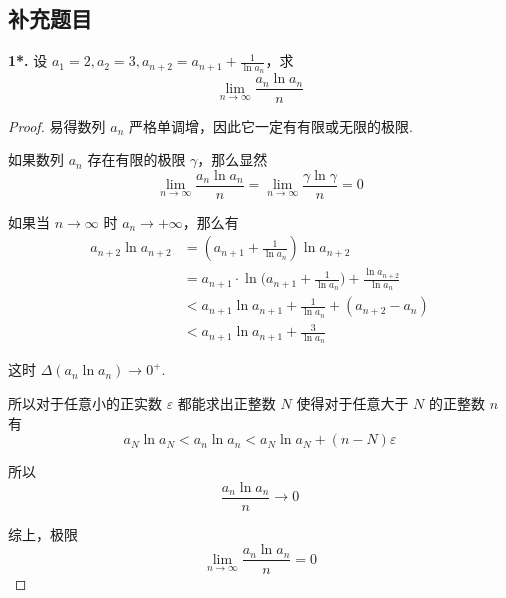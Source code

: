 \subsection{补充题目}
\textbf{1*.} 设 $\displaystyle a_1 = 2, a_2 = 3, a_{n+2} = a_{n+1} + \frac{1}{\ln a_n}$，求
\[\lim_{n \rightarrow \infty} \frac{a_n \ln a_n}{n}\]

\begin{proof}
    易得数列 $a_n$ 严格单调增，因此它一定有有限或无限的极限.

    如果数列 $a_n$ 存在有限的极限 $\gamma$，那么显然
    \[\lim_{n \rightarrow \infty} \frac{a_n \ln a_n}{n} = \lim_{n \rightarrow \infty} \frac{\gamma \ln \gamma}{n} = 0\]

    如果当 $n \rightarrow \infty$ 时 $a_n \rightarrow +\infty$，那么有
    \begin{align*}
        a_{n+2}\ln a_{n+2} &= \left(a_{n+1} + \frac{1}{\ln a_n}\right) \ln a_{n+2}\\
        &= a_{n+1} \cdot \ln \biggl(a_{n+1} + \frac{1}{\ln a_n}\biggr) + \frac{\ln a_{n+2}}{\ln a_n}\\
        &< a_{n+1}\ln a_{n+1} + \frac{1}{\ln a_n} + (a_{n+2} - a_n)\\
        &< a_{n+1}\ln a_{n+1} + \frac{3}{\ln a_n}
    \end{align*}

    这时 $\Delta(a_n \ln a_n) \rightarrow 0^+$.

    所以对于任意小的正实数 $\varepsilon$ 都能求出正整数 $N$ 使得对于任意大于 $N$ 的正整数 $n$ 有
    \[a_N \ln a_N < a_n \ln a_n < a_N \ln a_N + (n-N)\varepsilon\]

    所以
    \[\frac{a_n \ln a_n}{n} \rightarrow 0\]

    综上，极限
    \[\lim_{n \rightarrow \infty} \frac{a_n \ln a_n}{n} = 0\]
\end{proof}